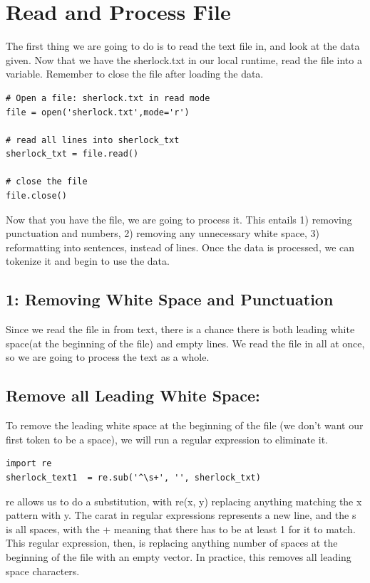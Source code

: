 \documentclass{article}
\begin{document}
\section{Read and Process File}

The first thing we are going to do is to read the text file in, and look at the data given. Now that we have the sherlock.txt in our local runtime, read the file into a variable. Remember to close the file after loading the data.

\begin{verbatim}
# Open a file: sherlock.txt in read mode
file = open('sherlock.txt',mode='r')
 
# read all lines into sherlock_txt
sherlock_txt = file.read()
 
# close the file
file.close()
\end{verbatim}

Now that you have the file, we are going to process it. This entails
1) removing punctuation and numbers, 2) removing any unnecessary white space, 3) reformatting into sentences, instead of lines. Once the data is processed, we can tokenize it and begin to use the data.

\subsection{1: Removing White Space and Punctuation}

Since we read the file in from text, there is a chance there is both leading white space(at the beginning of the file) and empty lines. We read the file in all at once, so we are going to process the text as a whole. 

\subsection{Remove all Leading White Space:}

To remove the leading white space at the beginning of the file (we don't want our first token to be a space), we will run a regular expression to eliminate it.
\begin{verbatim}
import re
sherlock_text1  = re.sub('^\s+', '', sherlock_txt)
\end{verbatim}

re allows us to do a substitution, with re(x, y) replacing anything matching the x pattern with y. The carat in regular expressions represents a new line, and the s is all spaces, with the + meaning that there has to be at least 1 for it to match. This regular expression, then, is replacing anything number of spaces at the beginning of the file with an empty vector. In practice, this removes all leading space characters. 
\end{document}
